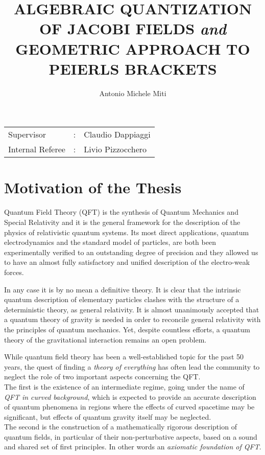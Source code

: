 \documentclass[a4paper,10pt]{amsart}
\title{ALGEBRAIC QUANTIZATION OF JACOBI FIELDS 
		 \emph{and}
		 GEOMETRIC APPROACH TO PEIERLS BRACKETS }
\author{Antonio Michele Miti}
\date{}
\begin{document}
\maketitle

\begin{center}
\begin{tabular}{l c l}
Supervisor & : & Claudio Dappiaggi \\
Internal Referee & : & Livio Pizzocchero \\
\end{tabular}

\end{center}


\section{Motivation of the Thesis}

Quantum Field Theory (QFT)  is the synthesis of Quantum Mechanics and Special Relativity and it is the general framework for the description of the physics of relativistic quantum systems.
Its most direct applications, quantum electrodynamics and the standard model of particles, are both been experimentally verified to an outstanding degree of precision and they allowed us to have an almost fully satisfactory and unified description of the electro-weak forces.

In any case it is by no mean a definitive theory. It is clear that the intrinsic quantum description of elementary particles clashes with the structure of a deterministic theory, as general relativity. 
It is almost unanimously accepted that a quantum theory of gravity is needed in order to reconcile general relativity with the principles of quantum mechanics. Yet, despite countless efforts, a quantum theory of the gravitational interaction remains an open problem.

While quantum field theory has been a well-established topic for the past 50 years, the quest of finding a \emph{theory of everything} has often lead the community to neglect the role of two important aspects concerning the QFT.\\
The first is the existence of an intermediate regime, going under the name of \emph{QFT in curved background}, which is expected to provide an accurate description of quantum phenomena in regions where the effects of curved spacetime may be significant, but effects of quantum gravity itself may be neglected. \\
The second is the construction of a mathematically rigorous description of quantum fields, in particular of their non-perturbative aspects,  based on a sound and shared set of first principles. In other words an \emph{axiomatic foundation of QFT}.
\end{document}
